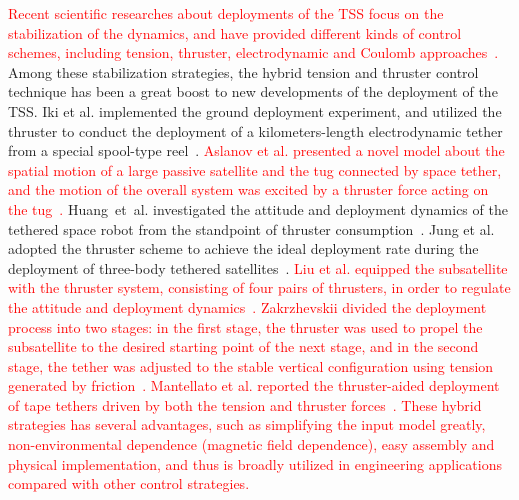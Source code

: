 \documentclass[3p]{elsarticle}
\theoremstyle{plain}
\theoremstyle{remark}
\begin{document}
\textcolor{red}{Recent scientific researches about deployments of the TSS focus on the stabilization of the dynamics, and have provided different kinds of control schemes, including tension, thruster, electrodynamic and Coulomb approaches~\cite{kojima2015stabilisation,qi2016dynamics,zhong2016research}.} Among these stabilization strategies, the hybrid tension and thruster control technique has been a great boost to new developments of the deployment of the TSS. Iki et al. implemented the ground deployment experiment, and utilized the thruster to conduct the deployment of a kilometers-length electrodynamic tether from a special spool-type reel~\cite{iki2014experiments}. \textcolor{red}{Aslanov et al. presented a novel model about the spatial motion of a large passive satellite and the tug connected by space tether, and the motion of the overall system was excited by a thruster force acting on the tug~\cite{aslanov2013dynamics}.} Huang~et~al. investigated the attitude and deployment dynamics of the tethered space robot from the standpoint of thruster consumption~\cite{huang2015coupling}. Jung et al. adopted the thruster scheme to achieve the ideal deployment rate during the deployment of three-body tethered satellites~\cite{jung2015nonlinear}. \textcolor{red}{Liu et al. equipped the subsatellite with the thruster system, consisting of four pairs of thrusters, in order to regulate the attitude and deployment dynamics~\cite{liu2014attitude}. Zakrzhevskii divided the deployment process into two stages: in the first stage, the thruster was used to propel the subsatellite to the desired starting point of the next stage, and in the second stage, the tether was adjusted to the stable vertical configuration using tension generated by friction~\cite{zakrzhevskii2016method}. Mantellato et al. reported the thruster-aided deployment of tape tethers driven by both the tension and thruster forces~\cite{mantellato2015thrust}. These hybrid strategies has several advantages, such as simplifying the input model greatly, non-environmental dependence (magnetic field dependence), easy assembly and physical implementation, and thus is broadly utilized in engineering applications compared with other control strategies.}\par
\end{document}
